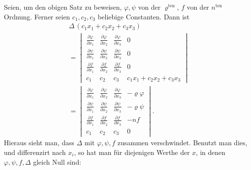 \documentclass[10pt]{article}
\begin{document}
Seien, um den obigen Satz zu beweisen, \(\varphi,\psi\) von der \(\varrho^{\text{ten}}\), \(f\) von der \(n^{\text{ten}}\) Ordnung. Ferner seien \(c_1,c_2,c_3\) beliebige Constanten. Dann ist
\[
\tag{1}
\begin{aligned}
&\Delta\,(c_1x_1+c_2x_2+c_3x_3)\\
&=
\begin{vmatrix}
\frac{\partial\varphi}{\partial x_1}&\frac{\partial\varphi}{\partial x_2}&\frac{\partial\varphi}{\partial x_3}&0\\
\frac{\partial\psi}{\partial x_1}&\frac{\partial\psi}{\partial x_2}&\frac{\partial\psi}{\partial x_3}&0\\
\frac{\partial f}{\partial x_1}&\frac{\partial f}{\partial x_2}&\frac{\partial f}{\partial x_3}&0\\
c_1&c_2&c_3&c_1x_1+c_2x_2+c_3x_3
\end{vmatrix}\\
&=
\begin{vmatrix}
\frac{\partial\varphi}{\partial x_1}&\frac{\partial\varphi}{\partial x_2}&\frac{\partial\varphi}{\partial x_3}&-\varrho\varphi\\
\frac{\partial\psi}{\partial x_1}&\frac{\partial\psi}{\partial x_2}&\frac{\partial\psi}{\partial x_3}&-\varrho\psi\\
\frac{\partial f}{\partial x_1}&\frac{\partial f}{\partial x_2}&\frac{\partial f}{\partial x_3}&-nf\\
c_1&c_2&c_3&0
\end{vmatrix}.
\end{aligned}
\]
Hieraus sieht man, dass \(\Delta\) mit \(\varphi,\psi,f\) zusammen verschwindet. Benutzt man dies, und differenzirt nach \(x_i\), so hat man für diejenigen Werthe der \(x\), in denen \(\varphi,\psi,f,\Delta\) gleich Null sind:
\end{document}
